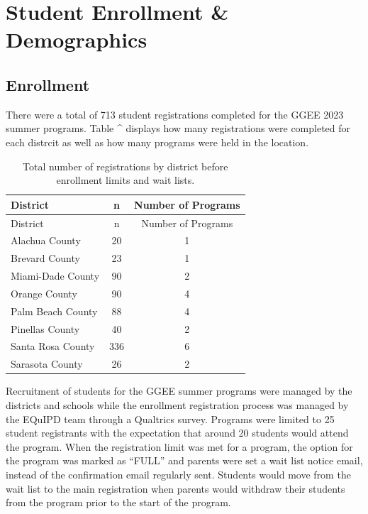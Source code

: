 \documentclass[
]{article}
\begin{document}
\hypertarget{student-enrollment-demographics}{%
\section{Student Enrollment \&
Demographics}\label{student-enrollment-demographics}}

\hypertarget{enrollment}{%
\subsection{Enrollment}\label{enrollment}}

There were a total of 713 student registrations completed for the GGEE
2023 summer programs. Table \^{} displays how many registrations were
completed for each distrcit as well as how many programs were held in
the location.

\begin{longtable}[]{@{}lcc@{}}
\caption{Total number of registrations by district before enrollment
limits and wait lists.}\tabularnewline
\toprule\noalign{}
District & n & Number of Programs \\
\midrule\noalign{}
\endfirsthead
\toprule\noalign{}
District & n & Number of Programs \\
\midrule\noalign{}
\endhead
\bottomrule\noalign{}
\endlastfoot
Alachua County & 20 & 1 \\
Brevard County & 23 & 1 \\
Miami-Dade County & 90 & 2 \\
Orange County & 90 & 4 \\
Palm Beach County & 88 & 4 \\
Pinellas County & 40 & 2 \\
Santa Rosa County & 336 & 6 \\
Sarasota County & 26 & 2 \\
\end{longtable}

Recruitment of students for the GGEE summer programs were managed by the
districts and schools while the enrollment registration process was
managed by the EQuIPD team through a Qualtrics survey. Programs were
limited to 25 student registrants with the expectation that around 20
students would attend the program. When the registration limit was met
for a program, the option for the program was marked as ``FULL'' and
parents were set a wait list notice email, instead of the confirmation
email regularly sent. Students would move from the wait list to the main
registration when parents would withdraw their students from the program
prior to the start of the program.
\end{document}
